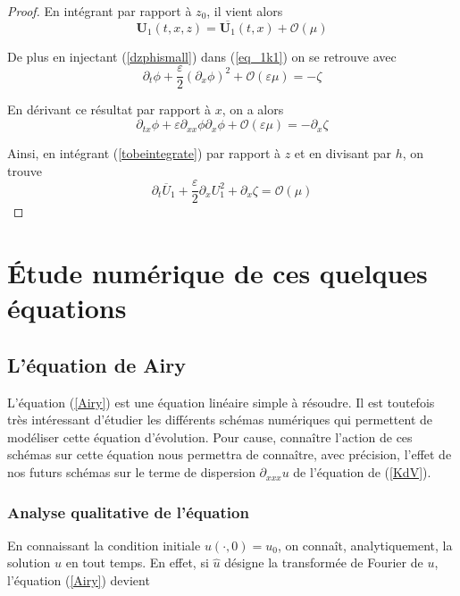 \documentclass[12pt,a4paper]{article}
\numberwithin{equation}{section}
\begin{document}
\begin{proof}
En intégrant par rapport à $z_0$, il vient alors
\begin{equation}
    \textbf{U}_1(t,x,z) = \overline{\textbf{U}_1}(t,x) + \mathcal{O}(\mu)
\end{equation}

De plus en injectant (\ref{dzphismall}) dans (\ref{eq_1k1}) on se retrouve avec
\begin{equation}
    \partial_{t} \phi + 
     \frac{\varepsilon}{2}(\partial_{x}\phi)^2+ \mathcal{O}(\varepsilon\mu) 
     =  -\zeta
\end{equation}

En dérivant ce résultat par rapport à $x$, on a alors
\begin{equation}
    \partial_{tx}\phi  + 
     \varepsilon\partial_{xx}\phi\partial_{x}\phi+ \mathcal{O}(\varepsilon\mu)
     = -\partial_x\zeta \label{tobeintegrate}
\end{equation}



Ainsi, en intégrant (\ref{tobeintegrate}) par rapport à $z$ et en divisant par $h$, on trouve
\begin{equation}
    \partial_t\overline{U}_1+\frac{\varepsilon}{2}\partial_x{U_1^2} + \partial_x\zeta = \mathcal{O}(\mu)
\end{equation}
\end{proof}
\newpage
\section{Étude numérique de ces quelques équations}
\subsection{ L'équation de Airy}
L'équation (\ref{Airy}) est une équation linéaire simple à résoudre. Il est toutefois très intéressant d'étudier les différents schémas numériques qui permettent de modéliser cette équation d'évolution. Pour cause, connaître l'action de ces schémas sur cette équation nous permettra de connaître, avec précision, l'effet de nos futurs schémas sur le terme de dispersion $\partial_{xxx}u$ de l'équation de (\ref{KdV}).
\\
\subsubsection{Analyse qualitative de l'équation}
En connaissant la condition initiale $u(\cdot,0) = u_0$, on connaît, analytiquement, la solution $u$ en tout temps. En effet, si $\hat{u}$ désigne la transformée de Fourier de $u$, l'équation (\ref{Airy}) devient
\end{document}
